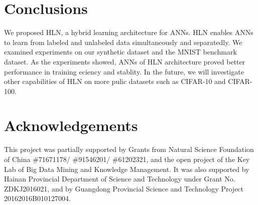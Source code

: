 \documentclass[3p,times,procedia]{elsarticle}
\begin{document}
\section{Conclusions}
We proposed HLN, a hybrid learning 
architecture for ANNs.
HLN enables ANNs to learn from
labeled and unlabeled data 
simultaneously and separatedly.
We examined experiments on our
synthetic dataset and the MNIST 
benchmark dataset.
As the experiments showed,
ANNs of HLN architecture 
proved better performance in
training eciency and stablity.
In the future, we will investigate
other capabilities of HLN on more
pulic datasets such as CIFAR-10 and
CIFAR-100.

\section*{Acknowledgements}
This project was partially supported 
by Grants from Natural Science 
Foundation of China
\#71671178/ \#91546201/ \#61202321, 
and the open project of the Key Lab 
of Big Data Mining and
Knowledge Management. 
It was also supported by Hainan 
Provincial Department of Science 
and Technology under Grant 
No. ZDKJ2016021, and by 
Guangdong Provincial Science and
Technology Project 
20162016B010127004.






\end{document}
